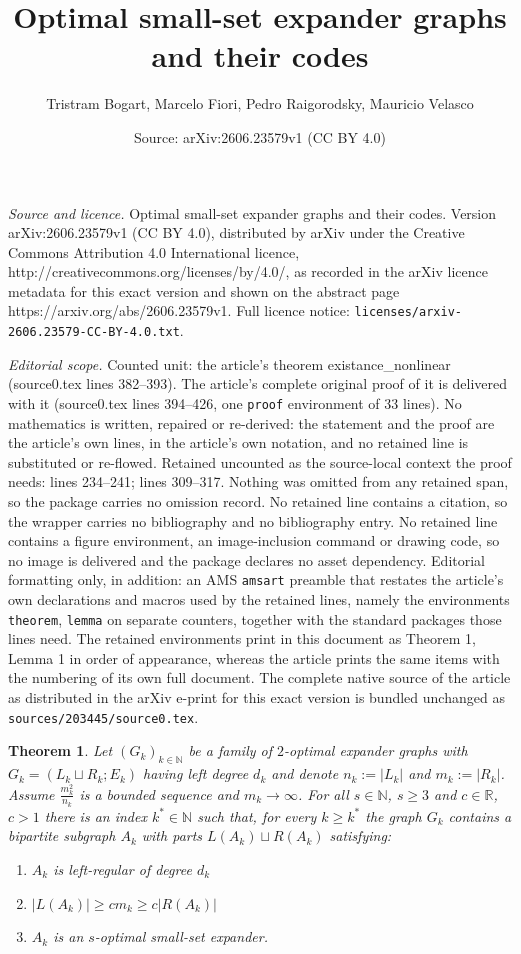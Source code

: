 \documentclass[10pt,a4paper]{amsart}
\title{Optimal small-set expander graphs and their codes}
\author{Tristram Bogart, Marcelo Fiori, Pedro Raigorodsky, Mauricio Velasco}
\date{Source: arXiv:2606.23579v1 (CC BY 4.0)}
\newtheorem{theorem}{Theorem}
\newcommand{\RR}{\ensuremath{\mathbb{R}}}
\renewcommand{\geq}{\geqslant}
\begin{document}
\maketitle

\noindent\emph{Source and licence.} Optimal small-set expander graphs and their codes. Version arXiv:2606.23579v1 (CC BY 4.0), distributed by arXiv under the Creative Commons Attribution 4.0 International licence, http://creativecommons.org/licenses/by/4.0/, as recorded in the arXiv licence metadata for this exact version and shown on the abstract page https://arxiv.org/abs/2606.23579v1. Full licence notice: \texttt{licenses/arxiv-2606.23579-CC-BY-4.0.txt}.\par\smallskip

\noindent\textit{Editorial scope.} Counted unit: the article's theorem existance\_nonlinear (source0.tex lines 382--393). The article's complete original proof of it is delivered with it (source0.tex lines 394--426, one \texttt{proof} environment of 33 lines). No mathematics is written, repaired or re-derived: the statement and the proof are the article's own lines, in the article's own notation, and no retained line is substituted or re-flowed.  Retained uncounted as the source-local context the proof needs: lines 234--241; lines 309--317.  Nothing was omitted from any retained span, so the package carries no omission record.  No retained line contains a citation, so the wrapper carries no bibliography and no bibliography entry.  No retained line contains a figure environment, an image-inclusion command or drawing code, so no image is delivered and the package declares no asset dependency.  Editorial formatting only, in addition: an AMS \texttt{amsart} preamble that restates the article's own declarations and macros used by the retained lines, namely the environments \texttt{theorem}, \texttt{lemma} on separate counters, together with the standard packages those lines need.  The retained environments print in this document as Theorem 1, Lemma 1 in order of appearance, whereas the article prints the same items with the numbering of its own full document.  The complete native source of the article as distributed in the arXiv e-print for this exact version is bundled unchanged as \texttt{sources/203445/source0.tex}.
\begin{theorem}\label{Thm: s_optimal_existence} Let $(G_k)_{k\in\mathbb{N}}$ be a family of $2$-optimal expander graphs with $G_k=(L_k\sqcup R_k; E_k)$ having left degree $d_k$ and denote $n_k:=|L_k|$ and $m_k:=|R_k|$. Assume $\frac{m_k^2}{n_k}$ is a bounded sequence and $m_k\rightarrow \infty$.
For all $s\in \mathbb{N}$, $s\geq 3$ and $c\in \RR$, $c>1$ there is an index $k^*\in \mathbb{N}$ such that, for every $k\geq k^*$ the graph $G_k$ contains a bipartite subgraph $A_k$ with parts $L(A_k)\sqcup R(A_k)$ satisfying:
\begin{enumerate}
\item $A_k$ is left-regular of degree $d_k$
\item $|L(A_k)|\geq cm_k\geq c|R(A_k)|$ 
\item $A_k$ is an $s$-optimal small-set expander.
\end{enumerate}
\end{theorem}
\end{document}
